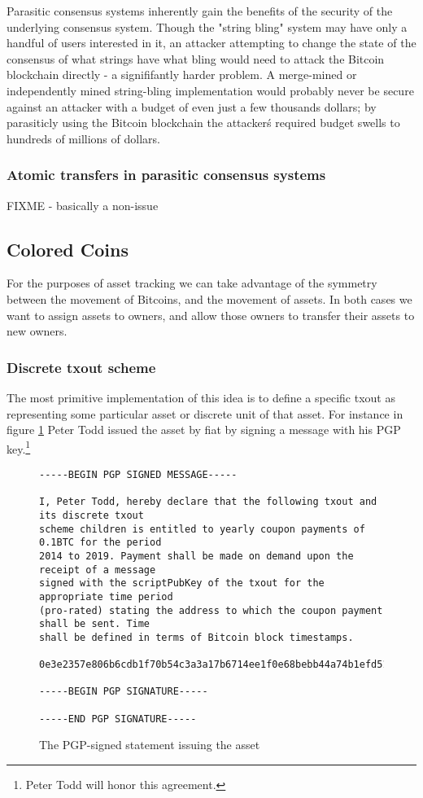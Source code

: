 \documentclass{article}
\begin{document}
Parasitic consensus systems inherently gain the benefits of the security of the
underlying consensus system. Though the "string bling" system may have only a
handful of users interested in it, an attacker attempting to change the state
of the consensus of what strings have what bling would need to attack the
Bitcoin blockchain directly - a signififantly harder problem. A merge-mined or
independently mined string-bling implementation would probably never be secure
against an attacker with a budget of even just a few thousands dollars; by
parasiticly using the Bitcoin blockchain the attacker\'s required budget swells
to hundreds of millions of dollars.


\subsubsection{Atomic transfers in parasitic consensus systems}

FIXME - basically a non-issue



\subsection{Colored Coins}

For the purposes of asset tracking we can take advantage of the symmetry
between the movement of Bitcoins, and the movement of assets. In both cases we
want to assign assets to owners, and allow those owners to transfer their
assets to new owners.


\subsubsection{Discrete txout scheme}

The most primitive implementation of this idea is to define a specific txout as
representing some particular asset or discrete unit of that asset. For instance
in figure \ref{fig:peter-bond} Peter Todd issued the asset by fiat by signing
a message with his PGP key.\footnote{Peter Todd will honor this agreement.}

\begin{figure}
\label{fig:peter-bond}
{\small
\begin{verbatim}
-----BEGIN PGP SIGNED MESSAGE-----

I, Peter Todd, hereby declare that the following txout and its discrete txout
scheme children is entitled to yearly coupon payments of 0.1BTC for the period
2014 to 2019. Payment shall be made on demand upon the receipt of a message
signed with the scriptPubKey of the txout for the appropriate time period
(pro-rated) stating the address to which the coupon payment shall be sent. Time
shall be defined in terms of Bitcoin block timestamps.

0e3e2357e806b6cdb1f70b54c3a3a17b6714ee1f0e68bebb44a74b1efd512098:0

-----BEGIN PGP SIGNATURE-----

-----END PGP SIGNATURE-----
\end{verbatim}
}
\caption{The PGP-signed statement issuing the asset}
\end{figure}
\end{document}

